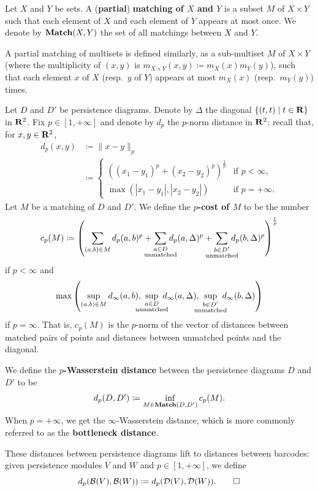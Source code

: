 \begin{definition}
\label{!D:distance}
\label{!D:Wasserstein}
  Let $X$ and $Y$ be sets. A (\textbf{partial}) \textbf{matching of $X$ and $Y$} is a subset $M$ of $X \times Y$ such that each element of $X$ and each element of $Y$ appears at most once. We denote by $\operatorname{\mathbf{Match}}(X, Y)$ the set of all matchings between $X$ and $Y$.

  A partial matching of multisets is defined similarly, as a sub-multiset $M$ of $X \times Y$ (where the multiplicity of $(x, y)$ is $m_{X \times Y}(x, y) \coloneq m_X(x) m_Y(y)$), such that each element $x$ of $X$ (resp.\ $y$ of $Y$) appears at most $m_X(x)$ (resp.\ $m_Y(y)$) times.
  
  Let $D$ and $D'$ be persistence diagrams. Denote by $\Delta$ the diagonal $\{(t, t) \mid t \in \mathbf{R}\}$ in $\mathbf{R}^2$. Fix $p \in [1, +\infty]$ and denote by $d_p$ the $p$-norm distance in $\mathbf{R}^2$: recall that, for $x, y \in \mathbf{R}^2$,
  \begin{align*}
    d_p(x, y) & \coloneq \| x - y \|_p \\
    & \coloneq \begin{cases}
      \left( (x_1 - y_1)^p + (x_2 - y_2)^p \right)^{\frac{1}{p}} & \text{if } p < \infty, \\
      \max(|x_1 - y_1|, |x_2 - y_2|) & \text{if } p = +\infty.
    \end{cases}
  \end{align*}
  Let $M$ be a matching of $D$ and $D'$. We define the \textbf{$p$-cost of $M$} to be the number
  \[
    c_p(M) \coloneq \left(
      \sum_{(a, b) \in M} d_p(a, b)^p + \sum_{\substack{a \in D \\ \mathclap{\text{unmatched}}}} d_p(a, \Delta)^p + \sum_{\substack{b \in D' \\ \mathclap{\text{unmatched}}}} d_p(b, \Delta)^p
    \right)^{\frac{1}{p}}
  \]
  if $p < \infty$ and
  \[
    \max\left(
      \sup_{(a, b) \in M} d_\infty(a, b), \;
      \sup_{\substack{a \in D \\ \mathclap{\text{unmatched}}}} \; d_\infty(a, \Delta), \;
      \sup_{\substack{b \in D' \\ \mathclap{\text{unmatched}}}} \; d_\infty(b, \Delta)
    \right)
  \]
  if $p = \infty$. That is, $c_p(M)$ is the $p$-norm of the vector of distances between matched pairs of points and distances between unmatched points and the diagonal.
  
  We define the \textbf{$p$-Wasserstein distance} between the persistence diagrams $D$ and $D'$ to be
  \[
    d_p(D, D') \coloneq \inf_{M \in \operatorname{\mathbf{Match}}(D, D')} c_p(M).
  \]
  When $p = +\infty$, we get the $\infty$-Wasserstein distance, which is more commonly referred to as the \textbf{bottleneck distance}.
  
  These distances between persistence diagrams lift to distances between barcodes: given persistence modules $V$ and $W$ and $p \in [1, +\infty]$, we define
  \[
    d_p(\mathcal{B}(V), \mathcal{B}(W)) \coloneq d_p(\mathcal{D}(V), \mathcal{D}(W)).
    \qedhere
  \]
\end{definition}

